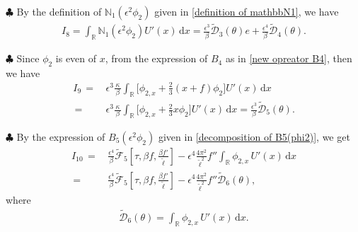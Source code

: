 \documentclass[10pt, reqno]{amsart}
\numberwithin{equation}{section}
\theoremstyle{definition}
\begin{document}
{\smallskip\noindent$\clubsuit$
By the definition of $ \mathbb{N}_1(\epsilon^2 \phi_2)$ given in \eqref{definition of mathbbN1}, we have
\begin{align}\label{I8}
I_8=\int_{{\mathbb R}}\mathbb{N}_1 (\epsilon^2 \phi_2)U'(x)\,{\mathrm d}x= \frac{\epsilon^3}{\beta} \tilde{\mathcal D}_3 (\theta) e+\frac{\epsilon^4}\beta \tilde{\mathcal D}_4 (\theta).
\end{align}



\smallskip\noindent$\clubsuit$
Since $\phi_2$ is even of $x$, from the expression of $ B_4$ as in \eqref{new opreator B4}, then we have
\begin{align}\label{B4phi2 intergral Ux}
I_9
 \,=\,& \epsilon^3 \frac{\kappa}{\, \beta\, }\int_{{\mathbb R}} \Big[ \phi_{2,x} +\frac{2}{3} (x+f)\phi_2\Big] U'(x) \,{\mathrm d}x
\nonumber\\[2mm]
 \,=\,&\epsilon^3 \frac{\kappa}{\, \beta\, }\int_{{\mathbb R}} \Big[ \phi_{2,x} +\frac{2}{3} x\phi_2\Big] U'(x) \,{\mathrm d}x
 = \frac{\epsilon^3 }{\beta} \tilde{\mathcal D}_5(\theta).
\end{align}



\smallskip\noindent$\clubsuit$
By the expression of $ B_{5} (\epsilon^2 \phi_2)$ given in \eqref{decomposition of B5(phi2)}, we get
\begin{align}\label{B5phi2 intergral Ux}
I_{10}
 \,=\, & \frac{\epsilon^4}{\beta}\tilde{\mathcal F}_5\left[\tau, \beta f, \frac{\beta {f}'}{\tilde\ell} \right]-\epsilon^4\frac{4\pi^2}{{\tilde\ell}^2} f'' \int_{\mathbb R}\phi_{2, x}\, U'(x) \,{\mathrm d}x
\nonumber\\[2mm]
 \,=\,& \frac{\epsilon^4}{\beta}\tilde{\mathcal F}_5\left[\tau, \beta f, \frac{\beta {f}'}{\tilde\ell} \right]-\epsilon^4\frac{4\pi^2}{{\tilde\ell}^2} f'' \tilde{\mathcal D}_6(\theta),
\end{align}
where
\begin{align*}
\tilde{\mathcal D}_6 (\theta)= \int_{\mathbb R}\phi_{2, x}\, U'(x) \,{\mathrm d}x.
\end{align*}


}
\end{document}
